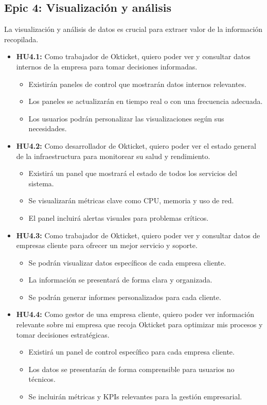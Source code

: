 \newpage{}
\subsection{Epic 4: Visualización y análisis}
La visualización y análisis de datos es crucial para extraer valor de la
información recopilada.

\begin{itemize}
    \item \textbf{HU4.1:} Como trabajador de Okticket, quiero poder ver y
    consultar datos internos de la empresa para tomar decisiones informadas.
    \begin{itemize}
        \item Existirán paneles de control que mostrarán datos internos relevantes.
        \item Los paneles se actualizarán en tiempo real o con una frecuencia adecuada.
        \item Los usuarios podrán personalizar las visualizaciones según sus necesidades.
    \end{itemize}

    \item \textbf{HU4.2:} Como desarrollador de Okticket, quiero poder ver el
    estado general de la infraestructura para monitorear su salud y rendimiento.
    \begin{itemize}
        \item Existirá un panel que mostrará el estado de todos los servicios del sistema.
        \item Se visualizarán métricas clave como CPU, memoria y uso de red.
        \item El panel incluirá alertas visuales para problemas críticos.
    \end{itemize}

    \item \textbf{HU4.3:} Como trabajador de Okticket, quiero poder ver y
    consultar datos de empresas cliente para ofrecer un mejor servicio y
    soporte.
    \begin{itemize}
        \item Se podrán visualizar datos específicos de cada empresa cliente.
        \item La información se presentará de forma clara y organizada.
        \item Se podrán generar informes personalizados para cada cliente.
    \end{itemize}

    \item \textbf{HU4.4:} Como gestor de una empresa cliente, quiero poder ver
    información relevante sobre mi empresa que recoja Okticket para optimizar
    mis procesos y tomar decisiones estratégicas.
    \begin{itemize}
        \item Existirá un panel de control específico para cada empresa cliente.
        \item Los datos se presentarán de forma comprensible para usuarios no técnicos.
        \item Se incluirán métricas y KPIs relevantes para la gestión empresarial.
    \end{itemize}
\end{itemize}

